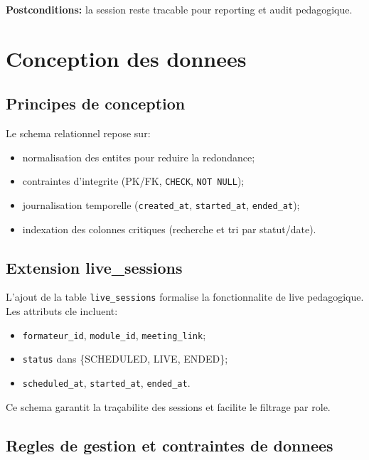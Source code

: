 ﻿\documentclass[12pt,a4paper,oneside]{report}
\begin{document}
\textbf{Postconditions:} la session reste tracable pour reporting et audit pedagogique.

\section{Conception des donnees}

\subsection{Principes de conception}

Le schema relationnel repose sur:
\begin{itemize}
  \item normalisation des entites pour reduire la redondance;
  \item contraintes d'integrite (PK/FK, \texttt{CHECK}, \texttt{NOT NULL});
  \item journalisation temporelle (\texttt{created\_at}, \texttt{started\_at}, \texttt{ended\_at});
  \item indexation des colonnes critiques (recherche et tri par statut/date).
\end{itemize}

\subsection{Extension live\_sessions}

L'ajout de la table \texttt{live\_sessions} formalise la fonctionnalite de live pedagogique.
Les attributs cle incluent:
\begin{itemize}
  \item \texttt{formateur\_id}, \texttt{module\_id}, \texttt{meeting\_link};
  \item \texttt{status} dans \{SCHEDULED, LIVE, ENDED\};
  \item \texttt{scheduled\_at}, \texttt{started\_at}, \texttt{ended\_at}.
\end{itemize}

Ce schema garantit la traçabilite des sessions et facilite le filtrage par role.

\subsection{Regles de gestion et contraintes de donnees}
\end{document}
